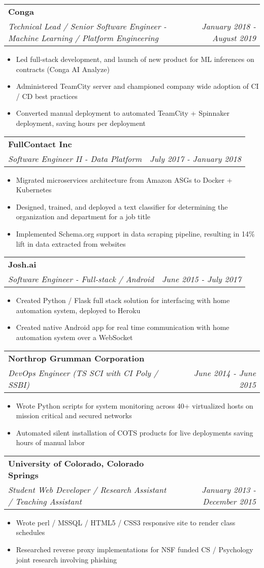 \documentclass[letterpaper,11pt]{article}
\makeatletter
\newcommand{\resumeItemNoBold}[1]{
  \item\small{
    {#1 \vspace{-2pt}}
  }
}
\newcommand{\resumeSubheading}[3]{
  \vspace{-1pt}\item
    \begin{tabular*}{0.97\textwidth}{l@{\extracolsep{\fill}}r}
      \textbf{#1} \\
      \textit{\small#2} & \textit{\small #3} \\
    \end{tabular*}\vspace{-5pt}
}
\newcommand{\resumeItemListStart}{\begin{itemize}}
\newcommand{\resumeItemListEnd}{\end{itemize}\vspace{-5pt}}
\makeatother
\begin{document}
    \resumeSubheading
      {Conga}
      {Technical Lead / Senior Software Engineer - Machine Learning / Platform Engineering}{January
        2018 - August 2019}
      \resumeItemListStart
        \resumeItemNoBold {Led full-stack development, and launch of new product for ML inferences on contracts (Conga AI Analyze)}
        \resumeItemNoBold {Administered TeamCity server and championed company wide adoption of CI / CD best practices}
        \resumeItemNoBold {Converted manual deployment to automated TeamCity + Spinnaker deployment, saving hours per deployment}
      \resumeItemListEnd

    \resumeSubheading
      {FullContact Inc}
      {Software Engineer II - Data Platform}{July 2017 - January 2018}
      \resumeItemListStart
        \resumeItemNoBold {Migrated microservices architecture from Amazon ASGs to Docker + Kubernetes}
        \resumeItemNoBold {Designed, trained, and deployed a text classifier for determining the organization and department for a job title}
        \resumeItemNoBold {Implemented Schema.org support in data scraping pipeline, resulting in 14\% lift in data extracted from websites}
      \resumeItemListEnd

    \resumeSubheading
      {Josh.ai}
      {Software Engineer - Full-stack / Android}{June 2015 - July 2017}
      \resumeItemListStart
        \resumeItemNoBold{Created Python / Flask full stack solution for interfacing with home automation system, deployed to Heroku}
        \resumeItemNoBold{Created native Android app for real time communication with home automation system over a WebSocket}
      \resumeItemListEnd

    \resumeSubheading
      {Northrop Grumman Corporation}
      {DevOps Engineer (TS SCI with CI Poly / SSBI)}{June 2014 - June 2015}
      \resumeItemListStart
        \resumeItemNoBold{Wrote Python scripts for system monitoring across 40+ virtualized hosts on mission critical and secured networks}
        \resumeItemNoBold{Automated silent installation of COTS products for live deployments saving hours of manual labor}
      \resumeItemListEnd

    \resumeSubheading
      {University of Colorado, Colorado Springs}
      {Student Web Developer / Research Assistant / Teaching Assistant}{January
      2013 - December 2015}
      \resumeItemListStart
        \resumeItemNoBold{Wrote perl / MSSQL / HTML5 / CSS3 responsive site to render class schedules}
        \resumeItemNoBold{Researched reverse proxy implementations for NSF funded CS / Psychology joint research involving phishing}
      \resumeItemListEnd
\end{document}
